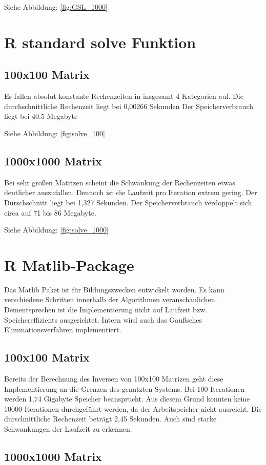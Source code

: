 Siehe Abbildung: \ref{fig:GSL_1000}

\section{R standard solve Funktion}
\subsection{100x100 Matrix}
Es fallen absolut konstante Rechenzeiten in insgesamt 4 Kategorien auf. Die durchschnittliche Rechenzeit liegt bei 0,00266 Sekunden
Der Speicherverbrauch liegt bei  40.5 Megabyte

Siehe Abbildung: \ref{fig:solve_100}

\subsection{1000x1000 Matrix}

Bei sehr großen Matrizen scheint die Schwankung der Rechenzeiten etwas deutlicher auszufallen. Dennoch ist die Laufzeit pro Iteration extrem gering. Der Durschschnitt liegt bei 1,327 Sekunden. Der Speicherverbrauch verdoppelt sich circa auf 71 bis 86 Megabyte.

Siehe Abbildung: \ref{fig:solve_1000}


\section{R Matlib-Package}
Das Matlib Paket ist für Bildungszwecken entwickelt worden. Es kann verschiedene Schritten innerhalb der Algorithmen veranschaulichen. Dementsprechen ist die Implementierung nicht auf Laufzeit bzw. Speichereffizients ausgerichtet. Intern wird auch das Gaußsches Eliminationsverfahren implementiert.

\subsection{100x100 Matrix}
Bereits der Berechnung des Inversen von 100x100 Matrizen geht diese Implementierung an die Grenzen des genutzten Systems. Bei 100 Iterationen werden 1,74 Gigabyte Speicher beansprucht. Aus diesem Grund konnten keine 10000 Iterationen durchgeführt werden, da der Arbeitspeicher nicht ausreicht.
Die durschnittliche Rechenzeit beträgt 2,45 Sekunden. Auch sind starke Schwankungen der Laufzeit zu erkennen.

\subsection{1000x1000 Matrix}

